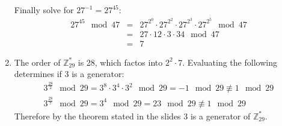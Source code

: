 \begin{enumerate}
    Finally solve for $27^{-1} = 27^{45}$:
    \begin{eqnarray*}
        27^{45} \mod 47 &=& 27^{2^{0}} \cdot 27^{2^{2}} \cdot 27^{2^{3}} \cdot 27^{2^{5}} \mod 47 \\
        &=& 27 \cdot 12 \cdot 3 \cdot 34 \mod 47 \\
        &=& 7
    \end{eqnarray*}

    \item The order of $\mathbb{Z}^{*}_{29}$ is 28, which factos into $2^{2} \cdot 7$. Evaluating the following determines if 3 is a generator:
    \begin{eqnarray*}
        3^{\frac{28}{2}} \mod 29 = 3^{8} \cdot 3^{4} \cdot 3^{2} \mod 29 = -1 \mod 29 \not\equiv 1 \mod 29 \\
        3^{\frac{28}{7}} \mod 29 = 3^{4} \mod 29 = 23 \mod 29 \not\equiv 1 \mod 29
    \end{eqnarray*}
    Therefore by the theorem stated in the slides\cite{Slides_70} 3 is a generator of $\mathbb{Z}^{*}_{29}$.

\end{enumerate}